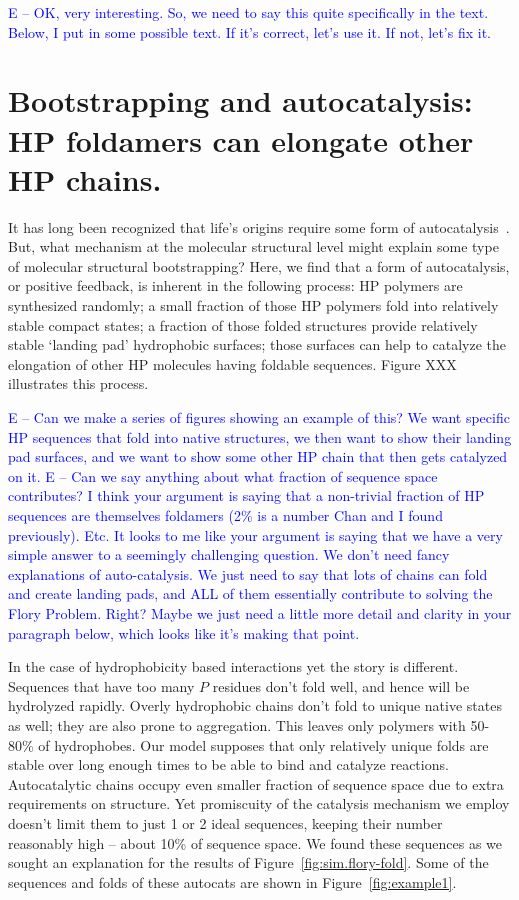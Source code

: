 \documentclass[journal=jacsat,manuscript=article,layout=twocolumn]{achemso}
\newcommand*{\blue}[1]{\textcolor{blue}{#1}}
\begin{document}
\blue{E -- OK, very interesting.  So, we need to say this quite specifically in the text.  
Below, I put in some possible text.  If it's correct, let's use it.  If not, let's fix it.  }

\section{Bootstrapping and autocatalysis: HP foldamers can elongate other HP chains.} 
 It has long been recognized that life's origins 
 require some form of autocatalysis~\cite{Kauffman1986,Dyson1985,Eigen1978}.  But, what mechanism 
at the molecular structural level might explain some type of molecular structural bootstrapping?  
Here, we find that a form of autocatalysis, or positive feedback, is inherent in the following 
process:  HP polymers are synthesized randomly; a small fraction of those HP polymers fold into 
relatively stable compact states; a fraction of those folded structures provide relatively stable 
`landing pad' hydrophobic surfaces; those surfaces can help to catalyze the elongation of other HP 
molecules having foldable sequences.  Figure XXX illustrates this process.
 
 \blue{E -- Can we make a series of figures showing an example of this?  
 We want specific HP sequences that fold into native structures, we then want to show their landing 
pad surfaces, and we want to show some other HP chain that then gets catalyzed on it.}
 \blue{E -- Can we say anything about what fraction of sequence space contributes?  
 I think your argument is saying that a non-trivial fraction of HP sequences are themselves 
foldamers (2\% is a number Chan and I found previously).  Etc.  It looks to me like your argument is 
saying that we have a very simple answer to a seemingly challenging question.  We don't need fancy 
explanations of auto-catalysis.  We just need to say that lots of chains can fold and create landing 
pads, and ALL of them essentially contribute to solving the Flory Problem.  Right?  Maybe we just 
need a little more detail and clarity in your paragraph below, which looks like it's making that 
point.}
 
 
In the case of hydrophobicity based interactions yet the story is different. Sequences that have 
too many $P$ residues don't fold well, and hence will be hydrolyzed rapidly.  Overly hydrophobic 
chains don't fold to unique native states as well; they are also prone to aggregation. This leaves 
only polymers with 50-80\% of hydrophobes. 
Our model supposes that only relatively unique folds are stable over long enough times to be able 
to bind and catalyze reactions.  Autocatalytic chains occupy even smaller fraction of 
sequence space due to extra requirements on structure. Yet promiscuity of the catalysis mechanism 
we employ doesn't limit them to just 1 or 2 ideal sequences, keeping their number reasonably high 
-- about 10\% of sequence space.  We found these sequences as we sought an explanation for 
the results of Figure~\ref{fig:sim.flory-fold}.  Some of the sequences and folds of these autocats 
are shown in Figure~\ref{fig:example1}.
\end{document}
